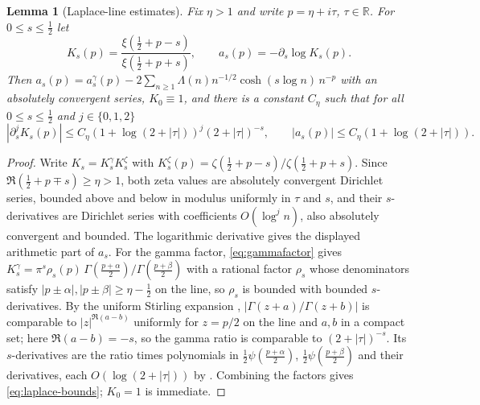 \documentclass[11pt]{article}
\numberwithin{equation}{section}
\newtheorem{lemma}[theorem]{Lemma}
\theoremstyle{definition}
\theoremstyle{remark}
\newcommand{\RR}{\mathbb R}
\begin{document}
\begin{lemma}[Laplace-line estimates]\label{lem:laplace}
Fix $\eta>1$ and write $p=\eta+i\tau$, $\tau\in\RR$. For $0\le s\le\tfrac12$ let
\[
 K_s(p)=\frac{\xi(\tfrac12+p-s)}{\xi(\tfrac12+p+s)},\qquad
 a_s(p)=-\partial_s\log K_s(p).
\]
Then $a_s(p)=a^\gamma_s(p)-2\sum_{n\ge1}\Lambda(n)n^{-1/2}\cosh(s\log n)\,n^{-p}$
with an absolutely convergent series, $K_0\equiv1$, and there is a constant
$C_\eta$ such that for all $0\le s\le\tfrac12$ and $j\in\{0,1,2\}$
\begin{equation}\label{eq:laplace-bounds}
 |\partial_s^jK_s(p)|\le C_\eta(1+\log(2+|\tau|))^j(2+|\tau|)^{-s},
 \qquad |a_s(p)|\le C_\eta(1+\log(2+|\tau|)).
\end{equation}
\end{lemma}
\begin{proof}
Write $K_s=K^\gamma_sK^\zeta_s$ with
$K^\zeta_s(p)=\zeta(\tfrac12+p-s)/\zeta(\tfrac12+p+s)$. Since
$\Re(\tfrac12+p\mp s)\ge\eta>1$, both zeta values are absolutely convergent
Dirichlet series, bounded above and below in modulus uniformly in $\tau$ and
$s$, and their $s$-derivatives are Dirichlet series with coefficients
$O(\log^jn)$, also absolutely convergent and bounded. The logarithmic
derivative gives the displayed arithmetic part of $a_s$. For the gamma factor,
\eqref{eq:gammafactor} gives $K^\gamma_s=\pi^s\rho_s(p)\,
\Gamma(\tfrac{p+\alpha}2)/\Gamma(\tfrac{p+\beta}2)$ with a rational factor
$\rho_s$ whose denominators satisfy $|p\pm\alpha|,|p\pm\beta|\ge\eta-\tfrac12$
on the line, so $\rho_s$ is bounded with bounded $s$-derivatives. By the
uniform Stirling expansion \cite[\S5.11(iii)]{DLMF},
$|\Gamma(z+a)/\Gamma(z+b)|$ is comparable to $|z|^{\Re(a-b)}$ uniformly for
$z=p/2$ on the line and $a,b$ in a compact set; here $\Re(a-b)=-s$, so the
gamma ratio is comparable to $(2+|\tau|)^{-s}$. Its $s$-derivatives are the
ratio times polynomials in $\tfrac12\psi(\tfrac{p+\alpha}2)$,
$\tfrac12\psi(\tfrac{p+\beta}2)$ and their derivatives, each
$O(\log(2+|\tau|))$ by \cite[\S5.11(i)]{DLMF}. Combining the factors gives
\eqref{eq:laplace-bounds}; $K_0=1$ is immediate.
\end{proof}
\end{document}
